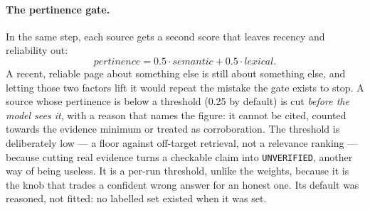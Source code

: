 \paragraph{The pertinence gate.} In the same step, each source gets a
second score that leaves recency and reliability out:
\[
  \textit{pertinence} = 0.5\cdot\textit{semantic} + 0.5\cdot\textit{lexical}.
\]
A recent, reliable page about something else is still about something
else, and letting those two factors lift it would repeat the mistake
the gate exists to stop. A source whose pertinence is below a threshold
(0.25 by default) is cut \emph{before the model sees it}, with a reason
that names the figure: it cannot be cited, counted towards the evidence
minimum or treated as corroboration. The threshold is deliberately low
--- a floor against off-target retrieval, not a relevance ranking ---
because cutting real evidence turns a checkable claim into
\texttt{UNVERIFIED}, another way of being useless. It is a per-run
threshold, unlike the weights, because it is the knob that trades a
confident wrong answer for an honest one. Its default was reasoned, not
fitted: no labelled set existed when it was set.
